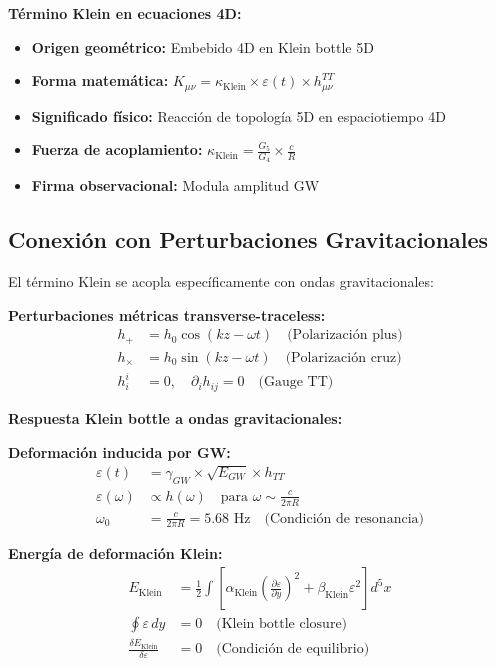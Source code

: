 \documentclass[12pt,a4paper]{article}
\begin{document}
\textbf{Término Klein en ecuaciones 4D:}
\begin{itemize}
\item \textbf{Origen geométrico:} Embebido 4D en Klein bottle 5D
\item \textbf{Forma matemática:} $K_{\mu\nu} = \kappa_{\text{Klein}} \times \varepsilon(t) \times h_{\mu\nu}^{TT}$
\item \textbf{Significado físico:} Reacción de topología 5D en espaciotiempo 4D
\item \textbf{Fuerza de acoplamiento:} $\kappa_{\text{Klein}} = \frac{G_5}{G_4} \times \frac{c}{R}$
\item \textbf{Firma observacional:} Modula amplitud GW
\end{itemize}

\subsection{Conexión con Perturbaciones Gravitacionales}

El término Klein se acopla específicamente con ondas gravitacionales:

\textbf{Perturbaciones métricas transverse-traceless:}
\begin{align}
h_+ &= h_0 \cos(kz - \omega t) \quad \text{(Polarización plus)}\\
h_\times &= h_0 \sin(kz - \omega t) \quad \text{(Polarización cruz)}\\
h_i^i &= 0, \quad \partial_i h_{ij} = 0 \quad \text{(Gauge TT)}
\end{align}

\textbf{Respuesta Klein bottle a ondas gravitacionales:}

\textbf{Deformación inducida por GW:}
\begin{align}
\varepsilon(t) &= \gamma_{GW} \times \sqrt{E_{GW}} \times h_{TT}\\
\varepsilon(\omega) &\propto h(\omega) \quad \text{para } \omega \sim \frac{c}{2\pi R}\\
\omega_0 &= \frac{c}{2\pi R} = 5.68 \text{ Hz} \quad \text{(Condición de resonancia)}
\end{align}

\textbf{Energía de deformación Klein:}
\begin{align}
E_{\text{Klein}} &= \frac{1}{2} \int \left[\alpha_{\text{Klein}} \left(\frac{\partial\varepsilon}{\partial y}\right)^2 + \beta_{\text{Klein}} \varepsilon^2\right] d^5x\\
\oint \varepsilon \, dy &= 0 \quad \text{(Klein bottle closure)}\\
\frac{\delta E_{\text{Klein}}}{\delta\varepsilon} &= 0 \quad \text{(Condición de equilibrio)}
\end{align}
\end{document}

